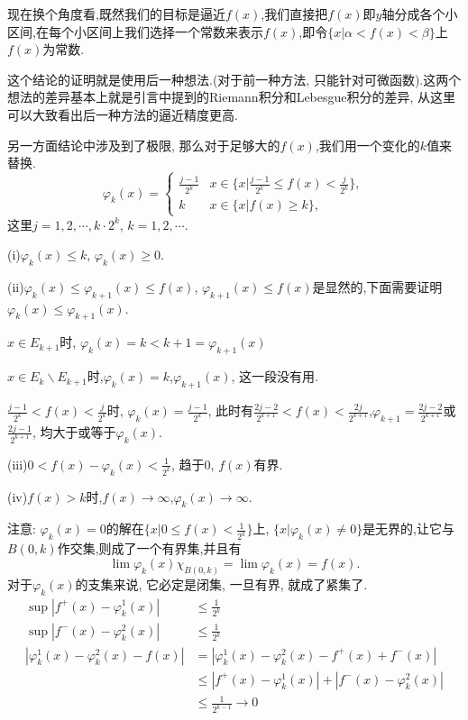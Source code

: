 \documentclass[12pt,a4paper,openany]{book}
\begin{document}
现在换个角度看,既然我们的目标是逼近$f(x)$,我们直接把$f(x)$即$y$轴分成各个小区间,在每个小区间上我们选择一个常数来表示$f(x)$,即令$\{x|\alpha<f(x)<\beta\}$上$f(x)$为常数.

这个结论的证明就是使用后一种想法.(对于前一种方法, 只能针对可微函数).这两个想法的差异基本上就是引言中提到的Riemann积分和Lebesgue积分的差异, 从这里可以大致看出后一种方法的逼近精度更高.

另一方面结论中涉及到了极限, 那么对于足够大的$f(x)$,我们用一个变化的$k$值来替换.
\[
\varphi_k(x) = 
\begin{cases}
\frac{j-1}{2^k} & x \in \{x | \frac{j-1}{2^k} \le f(x) < \frac{j}{2^k}\}, \\
k & x \in \{x | f(x) \ge k\},
\end{cases}
\]
这里$j = 1,2,\cdots,k\cdot2^k$, $k=1,2,\cdots$.

(i)$\varphi_k(x) \le k$, $\varphi_k(x) \ge 0$.

(ii)$\varphi_k(x) \le \varphi_{k+1}(x) \le f(x)$, $\varphi_{k+1}(x) \le f(x)$是显然的,下面需要证明$\varphi_{k}(x) \le \varphi_{k+1}(x)$.

$x \in E_{k+1}$时, $\varphi_k(x) = k < k+1 = \varphi_{k+1}(x)$

$x \in E_k \backslash E_{k+1}$时,$\varphi_k(x) = k$,$\varphi_{k+1}(x)$, 这一段没有用.

$\frac{j-1}{2^k} < f(x) < \frac{j}{2^k}$时, $\varphi_k(x) = \frac{j-1}{2^k}$, 此时有$\frac{2j-2}{2^{k+1}} < f(x) < \frac{2j}{2^{k+1}}$,$\varphi_{k+1} = \frac{2j-2}{2^{k+1}}$或$\frac{2j-1}{2^{k+1}}$, 均大于或等于$\varphi_k(x)$.

(iii)$0 < f(x) - \varphi_k(x) < \frac{1}{2^k}$, 趋于0, $f(x)$有界.

(iv)$f(x) > k$时,$f(x)\rightarrow \infty$,$\varphi_k(x) \rightarrow \infty$.

注意: $\varphi_k(x)=0$的解在$\{x|0\le f(x) < \frac{1}{2^k}\}$上, $\{x | \varphi_k(x) \neq 0\}$是无界的,让它与$B(0,k)$作交集,则成了一个有界集,并且有
\[
\lim{\varphi_k(x)\chi_{B(0,k)}} = \lim{\varphi_k(x)} =f(x).
\]
对于$\varphi_k(x)$的支集来说, 它必定是闭集, 一旦有界, 就成了紧集了.
\[
\begin{aligned}
\sup{|f^+(x) - \varphi_k^1(x)|} &\le \frac{1}{2^k} \\
\sup{|f^-(x) - \varphi_k^2(x)|} &\le \frac{1}{2^k} \\
|\varphi_k^1(x)-\varphi_k^2(x) - f(x)| &= |\varphi_k^1(x)- \varphi_k^2(x) - f^+(x) + f^-(x)| \\
&\le|f^+(x) - \varphi_k^1(x)| + |f^-(x)-\varphi_k^2(x)| \\
&\le \frac{1}{2^{k-1}} \rightarrow 0
\end{aligned}
\]
\end{document}
